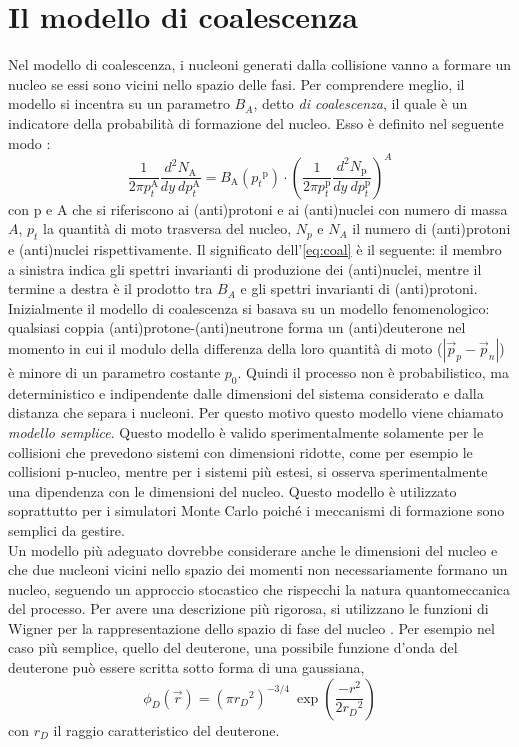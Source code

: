 \section{Il modello di coalescenza}
Nel modello di coalescenza, i nucleoni generati dalla collisione vanno a formare un nucleo se essi sono vicini nello spazio delle fasi.
Per comprendere meglio, il modello si incentra su un parametro $B_A$, detto \emph{di coalescenza}, il quale è un indicatore della probabilità di formazione del nucleo.
Esso è definito nel seguente modo \cite{alice_2022_coal_formula}:
\begin{equation}\label{eq:coal}
    \dfrac{1}{2\pi p_t^\text{A}}\dfrac{d^2N_\text{A}}{dy\ dp_t^\text{A}} = B_\text{A}({p_t}^\text{p}) \cdot  \left(\dfrac{1}{2\pi p_t^\text{p}}\dfrac{d^2N_\text{p}}{dy\ dp_t^\text{p}}\right)^A
\end{equation}
con p e A che si riferiscono ai (anti)protoni e ai (anti)nuclei con numero di massa $A$, $p_t$ la quantità di moto trasversa del nucleo, $N_p$ e $N_A$ il numero di (anti)protoni e (anti)nuclei rispettivamente.
Il significato dell'\autoref{eq:coal} è il seguente: il membro a sinistra indica gli spettri invarianti di produzione dei (anti)nuclei, mentre il termine a destra è il prodotto tra $B_A$ e gli spettri invarianti di (anti)protoni.\\

Inizialmente il modello di coalescenza si basava su un modello fenomenologico: qualsiasi coppia (anti)protone-(anti)neutrone forma un (anti)deuterone nel momento in cui il modulo della differenza della loro quantità di moto ($|\vec p_p - \vec p_n|$) è minore di un parametro costante $p_0$.
Quindi il processo non è probabilistico, ma deterministico e indipendente dalle dimensioni del sistema considerato e dalla distanza che separa i nucleoni.
Per questo motivo questo modello viene chiamato \emph{modello semplice}.
Questo modello è valido sperimentalmente solamente per le collisioni che prevedono sistemi con dimensioni ridotte, come per esempio le collisioni p-nucleo, mentre per i sistemi più estesi, si osserva sperimentalmente una dipendenza con le dimensioni del nucleo.
Questo modello è utilizzato soprattutto per i simulatori Monte Carlo poiché i meccanismi di formazione sono semplici da gestire.\\

Un modello più adeguato dovrebbe considerare anche le dimensioni del nucleo e che due nucleoni vicini nello spazio dei momenti non necessariamente formano un nucleo, seguendo un approccio stocastico che rispecchi la natura quantomeccanica del processo.
Per avere una descrizione più rigorosa, si utilizzano le funzioni di Wigner per la rappresentazione dello spazio di fase del nucleo \cite{Scheibl_1999_wigner}.
Per esempio nel caso più semplice, quello del deuterone, una possibile funzione d'onda del deuterone può essere scritta sotto forma di una gaussiana, 
\begin{equation}
    \phi_D(\vec r) = (\pi {r_D}^2)^{-3/4}\ \exp\left(\dfrac{-r^2}{2{r_D}^2}\right)
\end{equation}
con $r_D$ il raggio caratteristico del deuterone.

